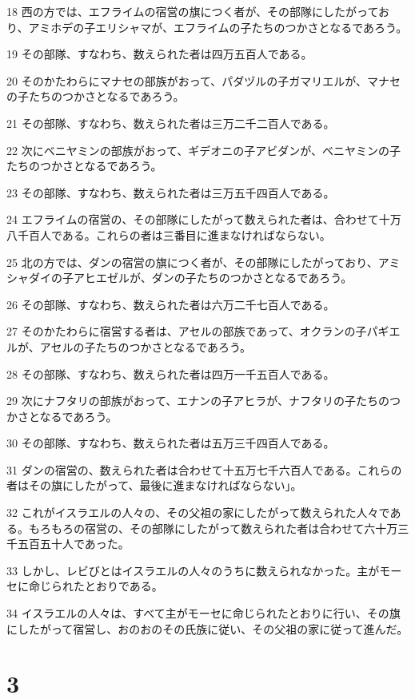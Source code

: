 \par 18 西の方では、エフライムの宿営の旗につく者が、その部隊にしたがっており、アミホデの子エリシャマが、エフライムの子たちのつかさとなるであろう。
\par 19 その部隊、すなわち、数えられた者は四万五百人である。
\par 20 そのかたわらにマナセの部族がおって、パダヅルの子ガマリエルが、マナセの子たちのつかさとなるであろう。
\par 21 その部隊、すなわち、数えられた者は三万二千二百人である。
\par 22 次にベニヤミンの部族がおって、ギデオニの子アビダンが、ベニヤミンの子たちのつかさとなるであろう。
\par 23 その部隊、すなわち、数えられた者は三万五千四百人である。
\par 24 エフライムの宿営の、その部隊にしたがって数えられた者は、合わせて十万八千百人である。これらの者は三番目に進まなければならない。
\par 25 北の方では、ダンの宿営の旗につく者が、その部隊にしたがっており、アミシャダイの子アヒエゼルが、ダンの子たちのつかさとなるであろう。
\par 26 その部隊、すなわち、数えられた者は六万二千七百人である。
\par 27 そのかたわらに宿営する者は、アセルの部族であって、オクランの子パギエルが、アセルの子たちのつかさとなるであろう。
\par 28 その部隊、すなわち、数えられた者は四万一千五百人である。
\par 29 次にナフタリの部族がおって、エナンの子アヒラが、ナフタリの子たちのつかさとなるであろう。
\par 30 その部隊、すなわち、数えられた者は五万三千四百人である。
\par 31 ダンの宿営の、数えられた者は合わせて十五万七千六百人である。これらの者はその旗にしたがって、最後に進まなければならない」。
\par 32 これがイスラエルの人々の、その父祖の家にしたがって数えられた人々である。もろもろの宿営の、その部隊にしたがって数えられた者は合わせて六十万三千五百五十人であった。
\par 33 しかし、レビびとはイスラエルの人々のうちに数えられなかった。主がモーセに命じられたとおりである。
\par 34 イスラエルの人々は、すべて主がモーセに命じられたとおりに行い、その旗にしたがって宿営し、おのおのその氏族に従い、その父祖の家に従って進んだ。

\chapter{3}

